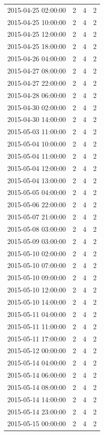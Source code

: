\begin{tabular}{lrrr}
2015-04-25 02:00:00 & 2 & 4 & 2 \\
2015-04-25 10:00:00 & 2 & 4 & 2 \\
2015-04-25 12:00:00 & 2 & 4 & 2 \\
2015-04-25 18:00:00 & 2 & 4 & 2 \\
2015-04-26 04:00:00 & 2 & 4 & 2 \\
2015-04-27 08:00:00 & 2 & 4 & 2 \\
2015-04-27 22:00:00 & 2 & 4 & 2 \\
2015-04-28 06:00:00 & 2 & 4 & 2 \\
2015-04-30 02:00:00 & 2 & 4 & 2 \\
2015-04-30 14:00:00 & 2 & 4 & 2 \\
2015-05-03 11:00:00 & 2 & 4 & 2 \\
2015-05-04 10:00:00 & 2 & 4 & 2 \\
2015-05-04 11:00:00 & 2 & 4 & 2 \\
2015-05-04 12:00:00 & 2 & 4 & 2 \\
2015-05-04 13:00:00 & 2 & 4 & 2 \\
2015-05-05 04:00:00 & 2 & 4 & 2 \\
2015-05-06 22:00:00 & 2 & 4 & 2 \\
2015-05-07 21:00:00 & 2 & 4 & 2 \\
2015-05-08 03:00:00 & 2 & 4 & 2 \\
2015-05-09 03:00:00 & 2 & 4 & 2 \\
2015-05-10 02:00:00 & 2 & 4 & 2 \\
2015-05-10 07:00:00 & 2 & 4 & 2 \\
2015-05-10 09:00:00 & 2 & 4 & 2 \\
2015-05-10 12:00:00 & 2 & 4 & 2 \\
2015-05-10 14:00:00 & 2 & 4 & 2 \\
2015-05-11 04:00:00 & 2 & 4 & 2 \\
2015-05-11 11:00:00 & 2 & 4 & 2 \\
2015-05-11 17:00:00 & 2 & 4 & 2 \\
2015-05-12 00:00:00 & 2 & 4 & 2 \\
2015-05-14 04:00:00 & 2 & 4 & 2 \\
2015-05-14 06:00:00 & 2 & 4 & 2 \\
2015-05-14 08:00:00 & 2 & 4 & 2 \\
2015-05-14 14:00:00 & 2 & 4 & 2 \\
2015-05-14 23:00:00 & 2 & 4 & 2 \\
2015-05-15 00:00:00 & 2 & 4 & 2 \\

\end{tabular}
